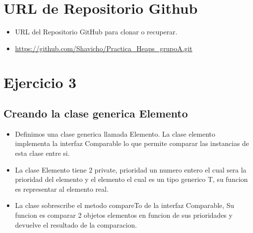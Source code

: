 \documentclass{article}
\begin{document}
	
	
	\section{URL de Repositorio Github}
	\begin{itemize}
		\item URL del Repositorio GitHub para clonar o recuperar.
		\item \url{https://github.com/Shavicho/Practica_Heaps_grupoA.git}
		
	\end{itemize}
	
	\section{Ejercicio 3}
	
	\subsection{Creando la clase generica Elemento}
	\begin{itemize}	
		\item Definimos una clase generica llamada Elemento. La clase elemento implementa la interfaz Comparable lo que permite comparar las instancias de esta clase entre si.
		\item La clase Elemento tiene 2 private, prioridad un numero entero el cual sera la prioridad del elemento y el elemento el cual es un tipo generico T, su funcion es representar al elemento real.
	\end{itemize}	
	
	\begin{itemize}
		\item La clase sobrescribe el metodo compareTo de la interfaz Comparable, Su funcion es comparar 2 objetos elementos en funcion de sus prioridades y devuelve el resultado de la comparacion.
	\end{itemize}
\end{document}
